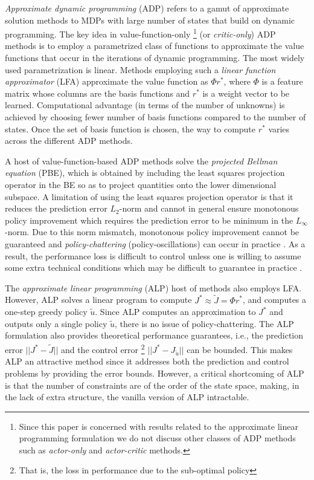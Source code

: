 \emph{Approximate dynamic programming} (ADP) \cite{dpchapter,powell} 
	refers to a gamut of approximate solution methods to MDPs with large number of states
	that build on dynamic programming.
The key idea in value-function-only%
\footnote{
		Since this paper is concerned with results related to the approximate linear programming formulation we do not 
		discuss other classes of ADP methods such as \emph{actor-only} and \emph{actor-critic} methods.} 
	(or \emph{critic-only}) ADP methods is to employ a parametrized class of functions
	to approximate the value functions that occur in the iterations of dynamic programming.
The most widely used parametrization is linear.
Methods employing such a \emph{linear function approximator} (LFA) 
	approximate the value function as $\Phi r^*$, 
	where $\Phi$ is a feature matrix whose columns are the basis functions 
	and $r^*$ is a weight vector to be learned. 
Computational advantage (in terms of the number of unknowns) 
	is achieved by choosing fewer number of basis functions compared to the number of states. 
Once the set of basis function is chosen, 
	the way to compute $r^*$ varies across the different ADP methods.

A host of value-function-based ADP methods solve 
	the \emph{projected Bellman equation} (PBE), 
	which is obtained by including the least squares projection operator in the BE 
	so as to project quantities onto the lower dimensional subspace. 
A limitation of using the least squares projection operator is that 
	it reduces the prediction error $L_2$-norm and cannot in general ensure monotonous policy improvement 
	which requires the prediction error to be minimum in the $L_\infty$-norm. 
Due to this norm mismatch, monotonous policy improvement cannot be guaranteed 
	and \emph{policy-chattering} (policy-oscillations) can occur in practice \cite{dpchapter}. 
As a result, the performance loss is difficult to control unless 
	one is willing to assume some extra technical conditions which may be difficult to guarantee in practice 
	\cite{anszemu:mlj07,FaMuSz10}.

The \emph{approximate linear programming} (ALP) \cite{ALP,CS,SALP,ALP-Bor,gkp,fs,npalp} host of methods 
	also employs LFA. 
However, ALP solves a linear program to compute $J^*\approx\tilde{J}=\Phi r^*$, 
	and computes a one-step greedy policy $\tilde{u}$. 
Since ALP computes an approximation to $J^*$ and outputs only a single policy $\tilde{u}$, 
	there is no issue of policy-chattering. 
The ALP formulation also provides theoretical performance guarantees, 
	i.e., the prediction error $||J^*-\tilde{J}||$ and the control error%
	\footnote{That is, the loss in performance due to the sub-optimal policy} 
	$||J^*-J_{\tilde{u}}||$ can be bounded. 
This makes ALP an attractive method since it addresses both the prediction 
	and control problems by providing the error bounds. 
However, a critical shortcoming of ALP is 
	that the number of constraints are of the order of the state space, 
	making, in the lack of extra structure, 
	the vanilla version of ALP intractable.

